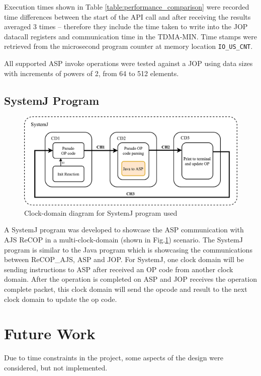 \documentclass[]{article}
\begin{document}
	Execution times shown in Table \ref{table:performance_comparison} were recorded time differences between the start of the API call and after receiving the results averaged 3 times -- therefore they include the time taken to write into the JOP datacall registers and communication time in the TDMA-MIN. Time stamps were retrieved from the microsecond program counter at memory location \texttt{IO\_US\_CNT}. \par 
	
	All supported ASP invoke operations were tested against a JOP using data sizes with increments of powers of 2, from 64 to 512 elements.
	
	\subsection{SystemJ Program}
	
	\begin{figure}[H]
		\centering
		\includegraphics[width = 5.5in]{sysj_clock_domain}
		\caption{Clock-domain diagram for SystemJ program used}
		\label{fig:sysj_clock_domain}
	\end{figure}
	
	
	A SystemJ program was developed to showcase the ASP communication with AJS ReCOP in a multi-clock-domain (shown in Fig.\ref{fig:sysj_clock_domain}) scenario.  The SystemJ program is similar to the Java program which is showcasing the communications between ReCOP\_AJS, ASP and JOP. For SystemJ, one clock domain will be sending instructions to ASP after received an OP code from another clock domain. After the operation is completed on ASP and JOP receives the operation complete packet, this clock domain will send the opcode and result to the next clock domain to update the op code.
	
	\section{Future Work} \label{sec:future_work}
	Due to time constraints in the project, some aspects of the design were considered, but not implemented.
	
\end{document}
